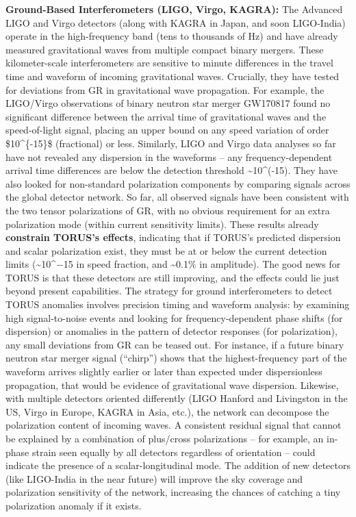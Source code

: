 \documentclass[
]{article}
\begin{document}
\textbf{Ground-Based Interferometers (LIGO, Virgo, KAGRA):} The Advanced
LIGO and Virgo detectors (along with KAGRA in Japan, and soon
LIGO-India) operate in the high-frequency band (tens to thousands of Hz)
and have already measured gravitational waves from multiple compact
binary mergers. These kilometer-scale interferometers are sensitive to
minute differences in the travel time and waveform of incoming
gravitational waves. Crucially, they have tested for deviations from GR
in gravitational wave propagation. For example, the LIGO/Virgo
observations of binary neutron star merger GW170817 found no significant
difference between the arrival time of gravitational waves and the
speed-of-light signal, placing an upper bound on any speed variation of
order \$10\^{}\{-15\}\$ (fractional) or less\hspace{0pt}. Similarly,
LIGO and Virgo data analyses so far have not revealed any dispersion in
the waveforms -- any frequency-dependent arrival time differences are
below the detection threshold \textasciitilde10\^{}(-15)\hspace{0pt}.
They have also looked for non-standard polarization components by
comparing signals across the global detector network. So far, all
observed signals have been consistent with the two tensor polarizations
of GR, with no obvious requirement for an extra polarization mode
(within current sensitivity limits). These results already
\textbf{constrain TORUS's effects}, indicating that if TORUS's predicted
dispersion and scalar polarization exist, they must be at or below the
current detection limits (\textasciitilde10\^{}−15 in speed fraction,
and \textasciitilde0.1\% in amplitude). The good news for TORUS is that
these detectors are still improving, and the effects could lie just
beyond present capabilities\hspace{0pt}. The strategy for ground
interferometers to detect TORUS anomalies involves precision timing and
waveform analysis: by examining high signal-to-noise events and looking
for frequency-dependent phase shifts (for dispersion) or anomalies in
the pattern of detector responses (for polarization), any small
deviations from GR can be teased out. For instance, if a future binary
neutron star merger signal (``chirp'') shows that the highest-frequency
part of the waveform arrives slightly earlier or later than expected
under dispersionless propagation, that would be evidence of
gravitational wave dispersion. Likewise, with multiple detectors
oriented differently (LIGO Hanford and Livingston in the US, Virgo in
Europe, KAGRA in Asia, etc.), the network can decompose the polarization
content of incoming waves. A consistent residual signal that cannot be
explained by a combination of plus/cross polarizations -- for example,
an in-phase strain seen equally by all detectors regardless of
orientation -- could indicate the presence of a scalar-longitudinal
mode. The addition of new detectors (like LIGO-India in the near future)
will improve the sky coverage and polarization sensitivity of the
network, increasing the chances of catching a tiny polarization anomaly
if it exists\hspace{0pt}.
\end{document}
